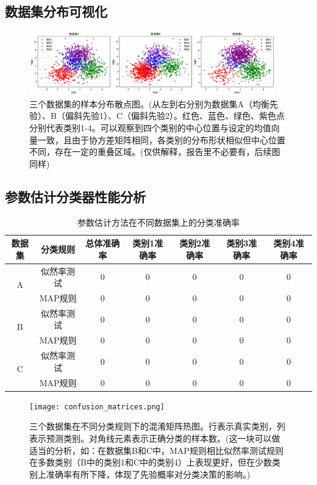 \documentclass[12pt]{article}
\begin{document}
\subsection{数据集分布可视化}
\begin{figure}[htbp]
\centering
\includegraphics[width=0.95\textwidth]{1.png}
\caption{三个数据集的样本分布散点图。(从左到右分别为数据集A（均衡先验）、B（偏斜先验1）、C（偏斜先验2）。红色、蓝色、绿色、紫色点分别代表类别1-4。可以观察到四个类别的中心位置与设定的均值向量一致，且由于协方差矩阵相同，各类别的分布形状相似但中心位置不同，存在一定的重叠区域。(仅供解释，报告里不必要有，后续图同样)}
\label{fig:dataset_dist}
\end{figure}

\subsection{参数估计分类器性能分析}

\begin{table}[htbp]
\centering
\caption{参数估计方法在不同数据集上的分类准确率}
\begin{tabular}{ccccccc}
\toprule
数据集 & 分类规则 & 总体准确率 & 类别1准确率 & 类别2准确率 & 类别3准确率 & 类别4准确率 \\
\midrule
\multirow{2}{*}{A} & 似然率测试 & 0 & 0 & 0 & 0 & 0 \\
& MAP规则 & 0 & 0 & 0 & 0 & 0 \\
\midrule
\multirow{2}{*}{B} & 似然率测试 & 0 & 0 & 0 & 0 & 0 \\
& MAP规则 & 0 & 0 & 0 & 0 & 0 \\
\midrule
\multirow{2}{*}{C} & 似然率测试 & 0 & 0 & 0 & 0 & 0 \\
& MAP规则 & 0 & 0 & 0 & 0 & 0 \\
\bottomrule
\end{tabular}
\end{table}


\begin{figure}[htbp]
\centering
\texttt{[image: confusion\_matrices.png]}
\caption{三个数据集在不同分类规则下的混淆矩阵热图。行表示真实类别，列表示预测类别。对角线元素表示正确分类的样本数。(这一块可以做适当的分析，如：在数据集B和C中，MAP规则相比似然率测试规则在多数类别（B中的类别1和C中的类别4）上表现更好，但在少数类别上准确率有所下降，体现了先验概率对分类决策的影响。)}
\label{fig:confusion_matrix}
\end{figure}
\end{document}
